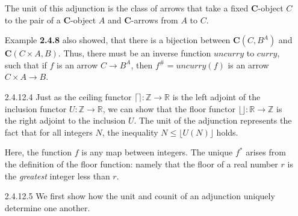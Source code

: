 \documentclass{article}
\newcommand{\ccat}{\mathbf{C}}
\newcommand{\dcat}{\mathbf{D}}
\newcommand{\ints}{\mathbb{Z}}
\newcommand{\reals}{\mathbb{R}}
\newcommand{\ceil}[1]{\lceil #1 \rceil}
\newcommand{\floor}[1]{\lfloor #1 \rfloor}
\begin{document}
\begin{enumerate}
\subitem
  The unit of this adjunction is the class of arrows that take a fixed $\ccat$-object $C$ to the pair of a $\ccat$-object $A$ and $\ccat$-arrows from $A$ to $C$.

  Example \textbf{2.4.8} also showed, that there is a bijection between $\ccat(C, B^A)$ and $\ccat(C \times A, B)$.
  Thus, there must be an inverse function $uncurry$ to $curry$, such that if $f$ is an arrow $C \rightarrow B^A$, then $f^\# = uncurry(f)$ is an arrow $C \times A \rightarrow B$.
  \begin{center}
  \end{center}

\vfill{}
\item[2.4.12.4]
  Just as the ceiling functor $\ceil{} : \ints \rightarrow \reals$ is the left adjoint of the inclusion functor $U : \ints \rightarrow \reals$, we can show that the floor functor $\floor{} : \reals \rightarrow \ints$ is the right adjoint to the inclusion $U$.
  The unit of the adjunction represents the fact that for all integers $N$, the inequality $N \le \floor{U(N)}$ holds.
  \begin{center}
  \end{center}
  Here, the function $f$ is any map between integers.
  The unique $f^*$ arises from the definition of the floor function: namely that the floor of a real number $r$ is the \emph{greatest} integer less than $r$.

\vfill{}
\newpage
\item[2.4.12.5]
  We first show how the unit and counit of an adjunction uniquely determine one another.


\end{enumerate}
\end{document}
